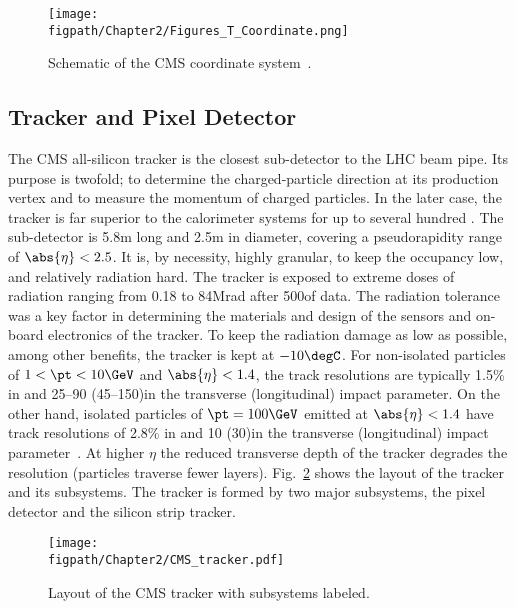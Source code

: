 \begin{figure}[!hbt]
    \centering
    \texttt{[image: \\figpath/Chapter2/Figures\_T\_Coordinate.png]}
    \caption{Schematic of the CMS coordinate system~\cite{Schott:2014sea}.}
    \label{fig:CMS_coordinate_system}
\end{figure}

\subsection{Tracker and Pixel Detector}
\label{sec:tracker_and_pixel}

The CMS all-silicon tracker is the closest sub-detector to the LHC beam pipe.
Its purpose is twofold; to determine the charged-particle direction at its production vertex and to measure the momentum of charged particles.
In the later case, the tracker is far superior to the calorimeter systems for \pt up to several hundred \gev.
The sub-detector is 5.8\unit{m} long and 2.5\unit{m} in diameter, covering a pseudorapidity range of $\abs{\eta}<2.5$.
It is, by necessity, highly granular, to keep the occupancy low, and relatively radiation hard.
The tracker is exposed to extreme doses of radiation ranging from 0.18 to 84\unit{Mrad} after 500\fbinv of data.
The radiation tolerance was a key factor in determining the materials and design of the sensors and on-board electronics of the tracker.
To keep the radiation damage as low as possible, among other benefits, the tracker is kept at $-10\degC$.
For non-isolated particles of $1<\pt<10\GeV$ and $\abs{\eta}<1.4$, the track resolutions are typically 1.5\% in \pt and 25--90 (45--150)\mum in the transverse (longitudinal) impact parameter.
On the other hand, isolated particles of $\pt=100\GeV$ emitted at $\abs{\eta}<1.4$ have track resolutions of 2.8\% in \pt and 10 (30)\mum in the transverse (longitudinal) impact parameter~\cite{TRK-11-001}.
At higher $\eta$ the reduced transverse depth of the tracker degrades the resolution (particles traverse fewer layers).
Fig.~\ref{fig:CMS_tracker} shows the layout of the tracker and its subsystems. The tracker is formed by two major subsystems, the pixel detector and the silicon strip tracker.


\begin{figure}[!hbt]
    \centering
    \texttt{[image: \\figpath/Chapter2/CMS\_tracker.pdf]}
    \caption{Layout of the CMS tracker with subsystems labeled.}
    \label{fig:CMS_tracker}
\end{figure}

